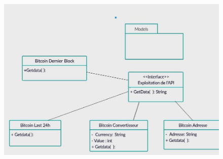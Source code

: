 \documentclass[12pt]{article}
\begin{document}
\begin{enumerate}
\begin{enumerate}
\vspace{\baselineskip}

\vspace{\baselineskip}

\vspace{\baselineskip}

\vspace{\baselineskip}

\vspace{\baselineskip}

\vspace{\baselineskip}

\vspace{\baselineskip}




\begin{figure}[H]
\advance\leftskip 0.35in		\includegraphics[width=5.52in,height=3.34in]{./media/image5.jpeg}
\end{figure}




\par


\vspace{\baselineskip}

\vspace{\baselineskip}

\vspace{\baselineskip}

\vspace{\baselineskip}

\vspace{\baselineskip}

\vspace{\baselineskip}

\vspace{\baselineskip}


\end{enumerate}
\end{enumerate}
\end{document}
